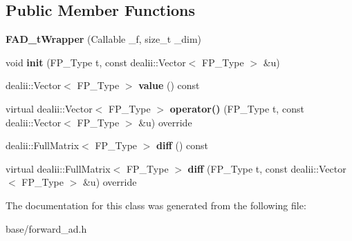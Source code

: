 \subsection*{Public Member Functions}
\begin{DoxyCompactItemize}
\item 
\mbox{\label{classFAD__tWrapper_a6f51a6e3b0d626a2736f8ab7b0b622df}} 
{\bfseries F\+A\+D\+\_\+t\+Wrapper} (Callable \+\_\+f, size\+\_\+t \+\_\+dim)
\item 
\mbox{\label{classFAD__tWrapper_a456f9ca36aafe8cd1dae76eeb4b2b120}} 
void {\bfseries init} (F\+P\+\_\+\+Type t, const dealii\+::\+Vector$<$ F\+P\+\_\+\+Type $>$ \&u)
\item 
\mbox{\label{classFAD__tWrapper_ab3c163761c6eaae7a797ec292a41a496}} 
dealii\+::\+Vector$<$ F\+P\+\_\+\+Type $>$ {\bfseries value} () const
\item 
\mbox{\label{classFAD__tWrapper_a0d290c497dd611edf4202c6626eafab5}} 
virtual dealii\+::\+Vector$<$ F\+P\+\_\+\+Type $>$ {\bfseries operator()} (F\+P\+\_\+\+Type t, const dealii\+::\+Vector$<$ F\+P\+\_\+\+Type $>$ \&u) override
\item 
\mbox{\label{classFAD__tWrapper_aacbb649228e36aa5c6cd62e942d3b83c}} 
dealii\+::\+Full\+Matrix$<$ F\+P\+\_\+\+Type $>$ {\bfseries diff} () const
\item 
\mbox{\label{classFAD__tWrapper_aec8f08bbac948154e805f2b765dd150d}} 
virtual dealii\+::\+Full\+Matrix$<$ F\+P\+\_\+\+Type $>$ {\bfseries diff} (F\+P\+\_\+\+Type t, const dealii\+::\+Vector$<$ F\+P\+\_\+\+Type $>$ \&u) override
\end{DoxyCompactItemize}


The documentation for this class was generated from the following file\+:\begin{DoxyCompactItemize}
\item 
base/forward\+\_\+ad.\+h\end{DoxyCompactItemize}
